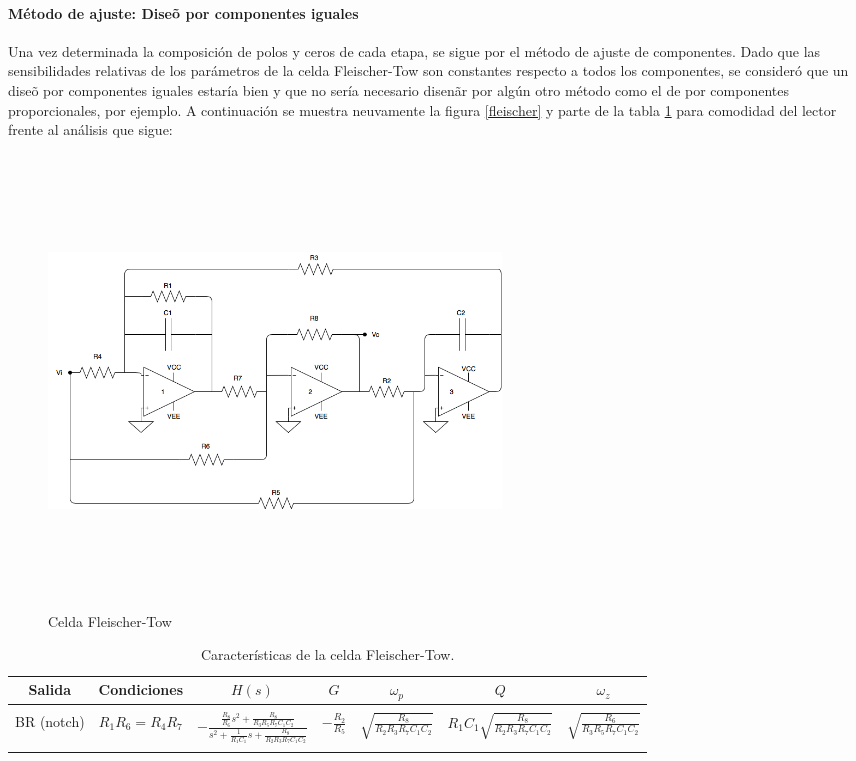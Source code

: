 \paragraph{M\'etodo de ajuste: Dise\~o  por componentes iguales}

Una vez determinada la composici\'on de polos y ceros de cada etapa, se sigue por el m\'etodo de ajuste de componentes. Dado que las sensibilidades relativas de los par\'ametros de la celda Fleischer-Tow son constantes respecto a todos los componentes, se consider\'o que un dise\~o por componentes iguales estar\'ia bien y que no ser\'ia necesario disen\~ar por alg\'un otro m\'etodo como el de por componentes proporcionales, por ejemplo. A continuaci\'on se muestra neuvamente la figura \ref{fleischer} y parte de la tabla \ref*{f_cars} para comodidad del lector frente al an\'alisis que sigue:

\begin{figure}[H] %
	\centering
	\includegraphics[width=12cm,height=12cm,keepaspectratio]{../EJ4/imagenes/FLEISCHER.png}
	\caption{Celda Fleischer-Tow}
	\label{fleischer2}
\end{figure}

\begin{table}[H] %
	\centering
	\begin{tabular}{c c c c c c c}
		Salida & Condiciones & $H(s)$ & $G$ & $\omega_p$ & $Q$ & $\omega_z$\\
		\hline \\
		BR (notch) &$R_1R_6=R_4R_7$ &\multirow{2}{*}{$- \frac{\frac{R_8}{R_6}s^2+\frac{R_8}{R_3R_5R_7C_1C_2}}{s^2+\frac{1}{R_1C_1}s+\frac{R_8}{R_2R_3R_7C_1C_2}}$}&\multirow{2}{*}{$-\frac{R_2}{R_5}$}& \multirow{2}{*}{$\sqrt{\frac{R_8}{R_2R_3R_7C_1C_2}}$}&
		\multirow{2}{*}{$R_1C_1\sqrt{\frac{R_8}{R_2R_3R_7C_1C_2}}$}
		&\multirow{2}{*}{$\sqrt{\frac{R_6}{R_3 R_5 R_7 C_1 C_2}}$}\\ \\ \\
		\hline
	\end{tabular}
	\caption{Caracter\'isticas de la celda Fleischer-Tow.}
	\label{f_cars}
\end{table}

